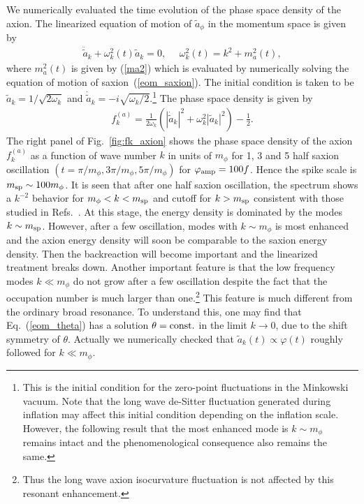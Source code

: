 \documentclass[12pt, a4paper]{article}
\begin{document}
We numerically evaluated the time evolution of the phase space density of the axion.
The linearized equation of motion of $\widetilde{a}_\phi$ in the momentum space is given by
\begin{align}
	\ddot {\widetilde a}_k + \omega_k^2(t)\widetilde a_k = 0,~~~~~~\omega_k^2(t) = k^2 + m_a^2(t),
\end{align}
where $m_a^2(t)$ is given by (\ref{ma2}) which is evaluated 
by numerically solving the equation of motion of saxion~(\ref{eom_saxion}).
The initial condition is taken to be 
${\widetilde a}_k = 1/\sqrt{2\omega_k}$ and $\dot{\widetilde a}_k = -i\sqrt{\omega_k/2}$.\footnote{
	This is the initial condition for the zero-point fluctuations in the Minkowski vacuum.
	Note that the long wave de-Sitter fluctuation generated during inflation may affect this initial condition depending on the inflation scale.
	However, the following result that the most enhanced mode is $k\sim m_\phi$ remains intact and 
	the phenomenological consequence also remains the same. 
}
The phase space density is given by
\begin{align}
	f_k^{(a)} = \frac{1}{2 \omega_k }\left( |\dot {\widetilde a}_k|^2 + \omega_k^2|{\widetilde a}_k|^2 \right) - \frac{1}{2}.
\end{align}
The right panel of Fig.~\ref{fig:fk_axion} shows the phase space density of the axion $f_k^{(a)}$ as a function of wave number $k$ in units of $m_\phi$
for 1, 3 and 5 half saxion oscillation $(t=\pi/m_\phi, 3\pi/m_\phi, 5\pi/m_\phi)$ for $\varphi_{\rm amp} = 100f$.
Hence the spike scale is $m_{\rm sp} \sim 100 m_\phi$.
It is seen that after one half saxion oscillation, the spectrum shows a $k^{-2}$ behavior for $m_\phi < k < m_{\rm sp}$
and cutoff for $k > m_{\rm sp}$ consistent with those studied in Refs.~\cite{Amin:2015ftc,Ema:2016dny}.
At this stage, the energy density is dominated by the modes $k \sim m_{\rm sp}$.
However, after a few oscillation, modes with $k \sim m_\phi$ is most enhanced and the axion energy density will soon be
comparable to the saxion energy density.
Then the backreaction will become important and the linearized treatment breaks down.
Another important feature is that the low frequency modes $k \ll m_\phi$ do not grow after a few oscillation
despite the fact that the occupation number is much larger than one.\footnote{
	Thus the long wave axion isocurvature fluctuation is not affected by this resonant enhancement.
}
This feature is much different from the ordinary broad resonance.
To understand this, one may find that Eq.~(\ref{eom_theta}) has a solution $\theta = {\rm const.}$ in the limit $k\to 0$,
due to the shift symmetry of $\theta$.
Actually we numerically checked that $\widetilde{a}_k(t) \propto \varphi(t)$ roughly followed for $k \ll m_\phi$.
\end{document}
